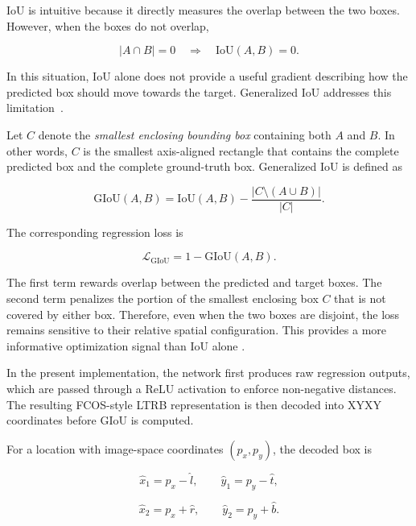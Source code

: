 \documentclass[11pt,a4paper]{article}
\begin{document}
IoU is intuitive because it directly measures the overlap between the two
boxes. However, when the boxes do not overlap,

\begin{equation}
|A\cap B|=0
\quad\Rightarrow\quad
\mathrm{IoU}(A,B)=0.
\end{equation}

In this situation, IoU alone does not provide a useful gradient describing
how the predicted box should move towards the target. Generalized IoU
addresses this limitation~\cite{rezatofighi2019giou}.

Let $C$ denote the \emph{smallest enclosing bounding box} containing both
$A$ and $B$. In other words, $C$ is the smallest axis-aligned rectangle that
contains the complete predicted box and the complete ground-truth box.
Generalized IoU is defined as

\begin{equation}
\mathrm{GIoU}(A,B)
=
\mathrm{IoU}(A,B)
-
\frac{|C\setminus(A\cup B)|}{|C|}.
\end{equation}

The corresponding regression loss is

\begin{equation}
\mathcal{L}_{\mathrm{GIoU}}
=
1-\mathrm{GIoU}(A,B).
\end{equation}

The first term rewards overlap between the predicted and target boxes. The
second term penalizes the portion of the smallest enclosing box $C$ that is
not covered by either box. Therefore, even when the two boxes are disjoint,
the loss remains sensitive to their relative spatial configuration. This
provides a more informative optimization signal than IoU alone
\cite{rezatofighi2019giou}.

In the present implementation, the network first produces raw regression
outputs, which are passed through a ReLU activation to enforce non-negative
distances. The resulting FCOS-style LTRB representation is then decoded into
XYXY coordinates before GIoU is computed.

For a location with image-space coordinates $(p_x,p_y)$, the decoded box is

\begin{equation}
\hat{x}_1=p_x-\hat{l},
\qquad
\hat{y}_1=p_y-\hat{t},
\end{equation}

\begin{equation}
\hat{x}_2=p_x+\hat{r},
\qquad
\hat{y}_2=p_y+\hat{b}.
\end{equation}
\end{document}
